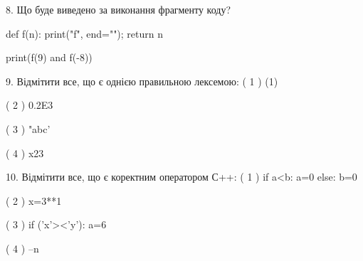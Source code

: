 \documentclass[11pt]{article}
\begin{document}
8. Що буде виведено за виконання фрагменту коду?

def f(n):
    print("f", end="");
    return n

print(f(9) and f(-8))
\vspace{5mm}

9. %
Відмітити все, що є однією правильною лексемою:
( 1 ) (1)

( 2 ) 0.2E3

( 3 ) "abc'

( 4 ) x23
\vspace{5mm}

10. %
Відмітити все, що є коректним оператором С++:
( 1 ) if a<b: a=0 else: b=0

( 2 ) x=3**1

( 3 ) if ('x'><'y'): a=6

( 4 ) --n
\vspace{5mm}

\newpage
\end{document}
